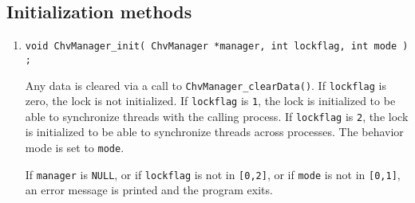 \subsection{Initialization methods}
\label{subsection:ChvManager:proto:initial}
\par
\begin{enumerate}
\item
\begin{verbatim}
void ChvManager_init( ChvManager *manager, int lockflag, int mode ) ;
\end{verbatim}
Any data is cleared via a call to
{\tt ChvManager\_clearData()}.
If {\tt lockflag} is zero, the lock is not initialized.
If {\tt lockflag} is {\tt 1}, the lock is initialized
to be able to synchronize threads with the calling process.
If {\tt lockflag} is {\tt 2}, the lock is initialized
to be able to synchronize threads across processes.
The behavior mode is set to {\tt mode}.
\par {}
If {\tt manager} is {\tt NULL},
or if {\tt lockflag} is not in {\tt [0,2]},
or if {\tt mode} is not in {\tt [0,1]},
an error message is printed and the program exits.
\end{enumerate}
\par
